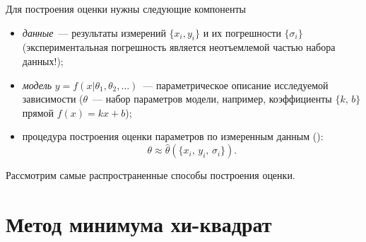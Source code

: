 %

Для построения оценки нужны следующие компоненты
\begin{itemize}
    \item \emph{данные}~--- результаты измерений $\{x_i, y_i\}$
    и их погрешности $\{\sigma_i\}$
    (экспериментальная погрешность является неотъемлемой
    частью набора данных!);
    \item \emph{модель} $y=f(x | {\theta_1,\theta_2,\ldots })$~---
параметрическое описание исследуемой зависимости
($\theta$~--- набор параметров модели, например,
коэффициенты $\{k,\,b\}$ прямой $f(x)=kx+b$);

\item процедура построения оценки параметров по
измеренным данным ():
\[
\theta \approx \hat{\theta}(\{x_i,\,y_i,\,\sigma_i\}).
\]
\end{itemize}

Рассмотрим самые распространенные способы построения оценки.

\section{Метод минимума хи-квадрат}
\label{sec:chi2}

